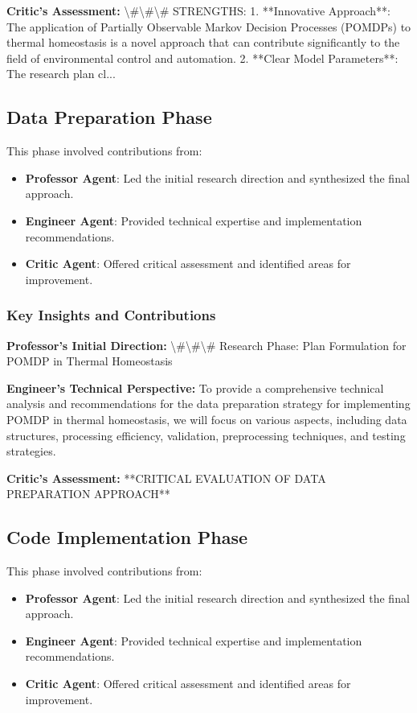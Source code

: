 \documentclass[11pt,a4paper]{article}
\begin{document}
\textbf{Critic's Assessment:} \textbackslash{}#\textbackslash{}#\textbackslash{}# STRENGTHS:
1. **Innovative Approach**: The application of Partially Observable Markov Decision Processes (POMDPs) to thermal homeostasis is a novel approach that can contribute significantly to the field of environmental control and automation.
2. **Clear Model Parameters**: The research plan cl...


\subsection{Data Preparation Phase}


This phase involved contributions from:

\begin{itemize}
\item \textbf{Professor Agent}: Led the initial research direction and synthesized the final approach.
\item \textbf{Engineer Agent}: Provided technical expertise and implementation recommendations.
\item \textbf{Critic Agent}: Offered critical assessment and identified areas for improvement.
\end{itemize}

\subsubsection{Key Insights and Contributions}


\textbf{Professor's Initial Direction:} \textbackslash{}#\textbackslash{}#\textbackslash{}# Research Phase: Plan Formulation for POMDP in Thermal Homeostasis


\textbf{Engineer's Technical Perspective:} To provide a comprehensive technical analysis and recommendations for the data preparation strategy for implementing POMDP in thermal homeostasis, we will focus on various aspects, including data structures, processing efficiency, validation, preprocessing techniques, and testing strategies.


\textbf{Critic's Assessment:} **CRITICAL EVALUATION OF DATA PREPARATION APPROACH**


\subsection{Code Implementation Phase}


This phase involved contributions from:

\begin{itemize}
\item \textbf{Professor Agent}: Led the initial research direction and synthesized the final approach.
\item \textbf{Engineer Agent}: Provided technical expertise and implementation recommendations.
\item \textbf{Critic Agent}: Offered critical assessment and identified areas for improvement.
\end{itemize}
\end{document}
